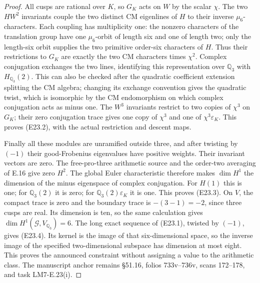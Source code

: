 \begin{proof}
All cusps are rational over $K$, so $G_K$ acts on $W$ by
the scalar $\chi$. The two $HW^2$ invariants couple the
two distinct CM eigenlines of $H$ to their inverse
$\mu_6$-characters. Each coupling has multiplicity one:
the nonzero characters of the translation group have one
$\mu_6$-orbit of length six and one of length two; only
the length-six orbit supplies the two primitive order-six
characters of $H$. Thus their restrictions to $G_K$ are
exactly the two CM characters times $\chi^2$.
Complex conjugation exchanges the two lines, identifying
this representation over $\mathbb Q_3$ with
$H_{\mathbb Q_3}(2)$. This can also be checked after the
quadratic coefficient extension splitting the CM algebra;
changing its exchange convention gives the quadratic twist,
which is isomorphic by the CM endomorphism on which
complex conjugation acts as minus one.
The $W^3$ invariants restrict to two copies of $\chi^3$
on $G_K$; their zero conjugation trace gives one copy of
$\chi^3$ and one of $\chi^3\varepsilon_K$. This proves
(E23.2), with the actual restriction and descent maps.

Finally all these modules are unramified outside three,
and after twisting by $(-1)$ their good-Frobenius eigenvalues
have positive weights. Their invariant vectors are zero.
The free-pro-three arithmetic source and the order-two
averaging of E.16 give zero $H^2$. The global Euler
characteristic therefore makes $\dim H^1$ the dimension
of the minus eigenspace of complex conjugation.
For $H(1)$ this is one; for $\mathbb Q_3(2)$ it is zero;
for $\mathbb Q_3(2)\varepsilon_K$ it is one. This proves
(E23.3). On $V$, the compact trace is zero and the boundary
trace is $-(3-1)=-2$, since three cusps are real.
Its dimension is ten, so the same calculation gives
$\dim H^1(\mathcal G,V_{\mathbb Q_3})=6$.
The long exact sequence of (E23.1), twisted by $(-1)$,
gives (E23.4). Its kernel is the image of that
six-dimensional space, so the inverse image of the
specified two-dimensional subspace has dimension at most
eight. This proves the announced constraint without
assigning a value to the arithmetic class. The manuscript
anchor remains \S51.16, folios 733v--736v, scans 172--178,
and task LM7-E.23(i).
\end{proof}
